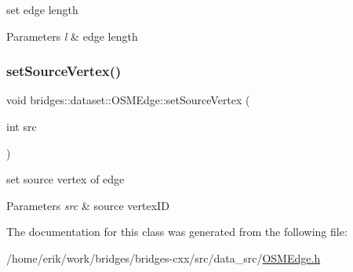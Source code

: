 set edge length


\begin{DoxyParams}{Parameters}
{\em l} & edge length \\
\hline
\end{DoxyParams}
\mbox{\label{classbridges_1_1dataset_1_1_o_s_m_edge_ac8a56c77922a5729b42d1e39f3f6516f}} 
\subsubsection{\texorpdfstring{set\+Source\+Vertex()}{setSourceVertex()}}
{\footnotesize\ttfamily void bridges\+::dataset\+::\+O\+S\+M\+Edge\+::set\+Source\+Vertex (\begin{DoxyParamCaption}\item[{int}]{src }\end{DoxyParamCaption})\hspace{0.3cm}{\ttfamily [inline]}}

set source vertex of edge


\begin{DoxyParams}{Parameters}
{\em src} & source vertex\+ID \\
\hline
\end{DoxyParams}


The documentation for this class was generated from the following file\+:\begin{DoxyCompactItemize}
\item 
/home/erik/work/bridges/bridges-\/cxx/src/data\+\_\+src/\hyperlink{_o_s_m_edge_8h}{O\+S\+M\+Edge.\+h}\end{DoxyCompactItemize}
